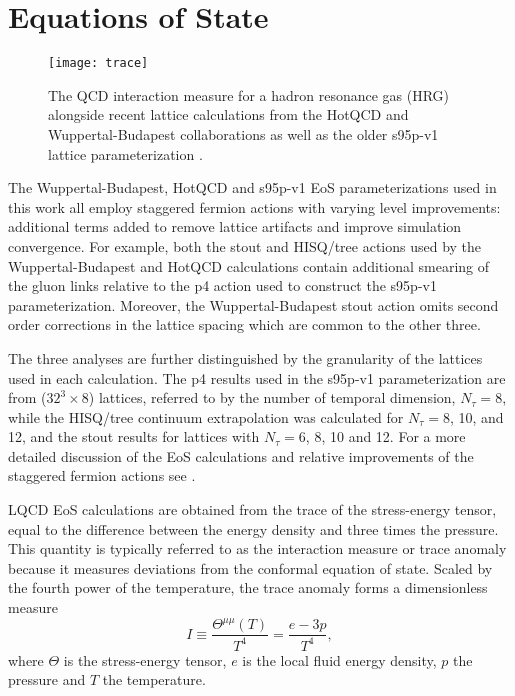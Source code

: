 \documentclass[aps,prc,reprint,amsmath,nofootinbib,superscriptaddress]{revtex4-1}
\begin{document}
\section{Equations of State}
\label{eos}

\begin{figure}[t]
  \texttt{[image: trace]}
  \caption{\label{fig:trace} The QCD interaction measure for a hadron resonance gas (HRG) alongside recent lattice calculations from the HotQCD and Wuppertal-Budapest collaborations as well as the older s95p-v1 lattice parameterization \cite{Bazavov:2014pvz, Borsanyi:2013bia, Huovinen:2009yb}.}
\end{figure}

The Wuppertal-Budapest, HotQCD and s95p-v1 EoS parameterizations used in this work all employ staggered fermion actions with varying level improvements: additional terms added to remove lattice artifacts and improve simulation convergence. 
For example, both the stout and HISQ/tree actions used by the Wuppertal-Budapest and HotQCD calculations contain additional smearing of the gluon links relative to the p4 action used to construct the s95p-v1 parameterization.
Moreover, the Wuppertal-Budapest stout action omits second order corrections in the lattice spacing which are common to the other three. 

The three analyses are further distinguished by the granularity of the lattices used in each calculation.
The p4 results used in the s95p-v1 parameterization are from ($32^3 \times 8$) lattices, referred to by the number of temporal dimension, $N_{\tau}=8$, while the HISQ/tree continuum extrapolation was calculated for $N_{\tau}=8$, 10, and 12, and the stout results for lattices with $N_{\tau}=6$, 8, 10 and 12. 
For a more detailed discussion of the EoS calculations and relative improvements of the staggered fermion actions see \cite{Soltz:2015ula}.

LQCD EoS calculations are obtained from the trace of the stress-energy tensor, equal to the difference between the energy density and three times the pressure. 
This quantity is typically referred to as the interaction measure or trace anomaly  because it measures deviations from the conformal equation of state. 
Scaled by the fourth power of the temperature, the trace anomaly forms a dimensionless measure 
\begin{equation}
 I \equiv \frac{\Theta^{\mu\mu}(T)}{T^4} = \frac{e - 3p}{T^4},
\end{equation}
where $\Theta$ is the stress-energy tensor, $e$ is the local fluid energy density, $p$ the pressure and $T$ the temperature.
\end{document}
